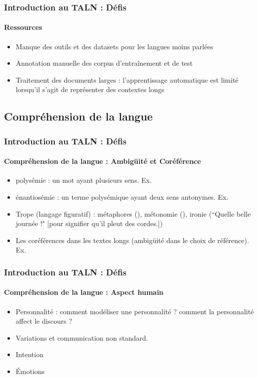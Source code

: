 \documentclass[xcolor=table]{beamer}
\begin{document}
\begin{frame}
\frametitle{Introduction au TALN : Défis}
\framesubtitle{Ressources}

\begin{itemize}
	\item Manque des outils et des datasets pour les langues moins parlées
	\item Annotation manuelle des corpus d'entraînement et de test
	\item Traitement des documents larges : l'apprentissage automatique est limité lorsqu'il s'agit de représenter des contextes longs 
\end{itemize}
\end{frame}

\subsection{Compréhension de la langue}

\begin{frame}
\frametitle{Introduction au TALN : Défis}
\framesubtitle{Compréhension de la langue : Ambigüité et Coréférence}

\begin{itemize}
	\item polysémie : un mot ayant plusieurs sens. Ex. 
	\item énantiosémie : un terme polysémique ayant deux sens antonymes. Ex. 
	\item Trope (langage figuratif) : métaphores (), métonomie (), ironie (``Quelle belle journée !" [pour signifier qu'il pleut des cordes.])
	\item Les coréférences dans les textes longs (ambigüité dans le choix de référence). 
	Ex. 
\end{itemize}

\end{frame}

\begin{frame}
\frametitle{Introduction au TALN : Défis}
\framesubtitle{Compréhension de la langue : Aspect humain}

\begin{itemize}
	\item Personnalité : comment modéliser une personnalité ? comment la personnalité affect le discours ?
	\item Variations et communication non standard. 
	\item Intention 
	\item Émotions 
\end{itemize}

\end{frame}
\end{document}
